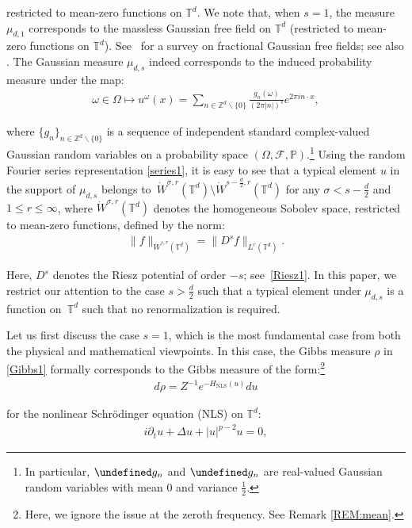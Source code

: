 \documentclass[letterpaper, 11pt,  reqno]{amsart}
\newcommand{\noi}{\noindent}
\newcommand{\Z}{\mathbb{Z}}
\newcommand{\T}{\mathbb{T}}
\let\Re=\undefined\DeclareMathOperator*{\Re}{Re}
\let\Im=\undefined\DeclareMathOperator*{\Im}{Im}
\newcommand{\F}{\mathcal{F}}
\newcommand{\Dl}{\Delta}
\newcommand{\s}{\sigma}
\newcommand{\dt}{\partial_t}
\renewcommand{\O}{\Omega}
\numberwithin{equation}{section}
\numberwithin{theorem}{section}
\newcommand{\PP}{\mathbb{P}}
\begin{document}
\noi
restricted to mean-zero functions on $\T^d$.
We note that,  
when $s=1$, the measure $\mu_{d, 1}$ corresponds to the massless 
Gaussian free field on $\mathbb{T}^d$
(restricted to mean-zero functions on $\T^d$).
See~\cite{LSSW}
for a survey on fractional Gaussian free fields;
see also \cite{She}.
The Gaussian measure $\mu_{d, s}$ 
indeed corresponds to  the induced probability measure under the map:
\begin{align}
\label{series1}
\omega\in \Omega \longmapsto u^\omega(x) = 
\sum_{n \in \mathbb{Z}^d\backslash\{0\}} \frac{g_n (\omega)}{ (2\pi |n|)^s}  e^{2\pi i n\cdot x},
\end{align}


\noi
where 
$\{ g_n \}_{n \in \Z^d\backslash \{0\}}$
is a sequence of  independent standard complex-valued
Gaussian random variables on 
a probability space $(\O,\F,\PP)$.\footnote{In particular,
$\Re g_n$ and $\Im g_n$ are real-valued Gaussian random variables
with mean 0 and variance $\frac 12$.}
Using the random Fourier series representation \eqref{series1}, 
it is easy to see that 
a typical  element $u$  in the support of $\mu_{d, s}$ 
belongs to~$\dot W^{\s, r}(\mathbb{T}^d) \setminus \dot W^{s - \frac d2, r}(\mathbb{T}^d)$ for any 
$\s < s - \frac d2$ and  $1\leq r \leq \infty$, 
where 
  $\dot W^{\s, r}(\mathbb{T}^d)$ denotes the homogeneous Sobolev space, 
restricted to mean-zero functions, 
defined by the norm:
\begin{align*}
\| f \|_{\dot W^{s, r}(\mathbb{T}^d)} = \| D^{s} f \|_{L^r(\mathbb{T}^d)}.
\end{align*}

\noi
Here,  $D^s$ denotes the Riesz potential of order $-s$; see~\eqref{Riesz1}.
In this paper, we restrict our attention 
to the case $s > \frac d2$ such that 
a typical element under $\mu_{d, s}$ is  a function on~$\T^d$
such that no renormalization is required.


Let us first discuss the case 
$s = 1$, which is the most fundamental case
from both the physical and mathematical viewpoints.
In this case, the Gibbs measure $\rho$ in \eqref{Gibbs1}
formally
 corresponds
to the Gibbs measure
of the form:\footnote{Here, we ignore the issue at the zeroth frequency.
See Remark \ref{REM:mean}.}
\begin{align}
d\rho = Z^{-1} e^{- H_\text{NLS}(u)} d u 
\label{Gibbs1a}
\end{align}

\noi
for the 
nonlinear Schr\"odinger equation (NLS) on $\T^d$:
\begin{align}
i \dt u +  \Dl u + |u|^{p-2} u = 0, 
\label{NLS1}
\end{align}
\end{document}
